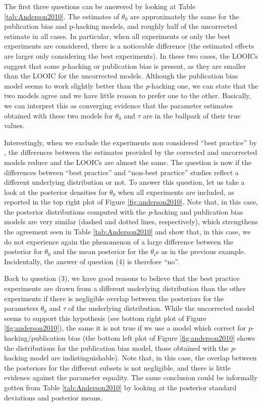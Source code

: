 \documentclass[preprint, authoryear]{elsarticle}
\theoremstyle{plain}
\theoremstyle{definition}
\begin{document}


The first three questions can be answered by looking at Table \ref{tab:Anderson2010}. The estimates of $\theta_{0}$ are approximately the same for the publication bias and p-hacking models, and roughly half of the uncorrected estimate in all cases. In particular, when all experiments or only the best experiments are considered, there is a noticeable difference (the estimated effects are larger only considering the best experiments). In these two cases, the LOOICs suggest that some \emph{p}-hacking or publication bias is present, as they are smaller than the LOOIC for the uncorrected models. Although the publication bias model seems to work slightly better than the \emph{p}-hacking one, we can state that the two models agree and we have little reason to prefer one to the other. Basically, we can interpret this as converging evidence that the parameter estimates obtained with these two models for $\theta_{0}$ and $\tau$ are in the ballpark of their true values.

Interestingly, when we exclude the experiments non considered ``best practice'' by \citet{anderson2010violent}, the differences between the estimates provided by the corrected and uncorrected models reduce and the LOOICs are almost the same. The question is now if the differences between ``best practice'' and ``non-best practice'' studies reflect a different underlying distribution or not. To answer this question, let us take a look at the posterior densities for $\theta_{0}$ when all experiments are included, as reported in the top right plot of Figure \ref{fig:anderson2010}. Note that, in this case, the posterior distributions computed with the \emph{p}-hacking and publication bias models are very similar (dashed and dotted lines, respectively), which strengthens the agreement seen in Table \ref{tab:Anderson2010} and show that, in this case, we do not experience again the phenomenon of a large difference between the posterior for $\theta_{0}$ and the mean posterior for the $\theta_{i}$s as in the previous example. Incidentally, the answer of question (4) is therefore ``no''.

Back to question (3), we have good reasons to believe that the best practice experiments are drawn from a different underlying distribution than the other experiments if there is negligible overlap between the posteriors for the parameters $\theta_{0}$ and $\tau$ of the underlying distribution. While the uncorrected model seems to support this hypothesis (see bottom right plot of Figure \ref{fig:anderson2010}), the same it is not true if we use a model which correct for $p$-hacking/publication bias (the bottom left plot of Figure \ref{fig:anderson2010} shows the distributions for the publication bias model, those obtained with the \emph{p}-hacking model are indistinguishable). Note that, in this case, the overlap between the posteriors for the different subsets is not negligible, and there is little evidence against the parameter equality. The same conclusion could be informally gotten from Table \ref{tab:Anderson2010} by looking at the posterior standard deviations and posterior means.
\end{document}
